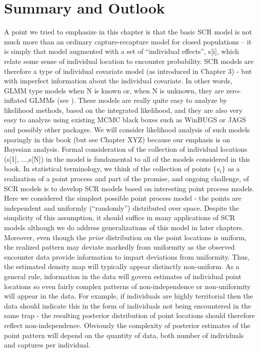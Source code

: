 \section{ Summary and Outlook  }
A point we tried to emphasize in this chapter is that the basic SCR
model is not much more than an ordinary capture-recapture model for
closed populations -- it is simply that model augmented with a set of
``individual effects'', s[i], which relate some sense of individual
location to encounter probability. SCR models are therefore a type of
individual covariate model (as introduced in Chapter 3) - but with
imperfect information about the individual covariate. In other words,
GLMM type models when N is known or, when N is unknown, they are
zero-inflated GLMMs (see \citet{royle:2006}).  These models are really quite easy to analyze by likelihood methods, based on the integrated likelihood, and they are also very easy to analyze using existing MCMC black boxes such as WinBUGS or JAGS and possibly other packages.  We will consider likelihood analysis of such models sparingly in this book (but see Chapter XYZ) because our emphasis is on Bayesian analysis. 
Formal consideration of the collection of individual locations (s[1], ...,s[N]) in the model is fundamental to all of the models considered in this book. In statistical terminology, we think of the collection of points $\{ s_{i} \}$ as a realization of a point process and part of the promise, and ongoing challenge, of SCR models is to develop SCR models based on interesting point process models. Here we considered the simplest possible point process model - the points are independent and uniformly (``randomly'') distributed over space. Despite the simplicity of this assumption, it should suffice in many applications of SCR models although we do address generalizations of this model in later chapters. Moreover, even though the {\it prior} distribution on the point locations is uniform, the realized pattern may deviate markedly from uniformity as the observed encounter data provide information to impart deviations from uniformity. Thus, the estimated density map will typically appear distinctly non-uniform.  As a general rule, information in the data will govern estimates of individual point locations so even fairly complex patterns of non-independence or non-uniformity will appear in the data. For example, if individuals are highly territorial then the data should indicate this in the form of individuals not being encountered in the same trap - the resulting posterior distribution of point locations should therefore reflect non-independence.  Obviously the complexity of posterior estimates of the point pattern will depend on the quantity of data, both number of individuals and captures per individual.
